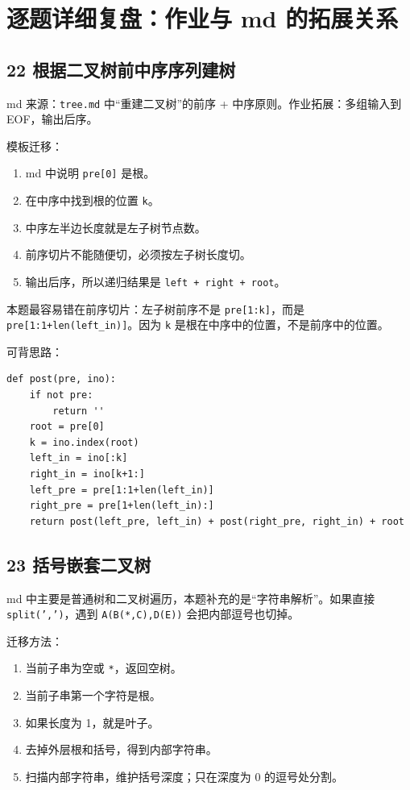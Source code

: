 \documentclass[10pt,a4paper,fontset=none]{ctexart}
\begin{document}
\section{逐题详细复盘：作业与 md 的拓展关系}

\subsection{22 根据二叉树前中序序列建树}
\begin{focusbox}
md 来源：\texttt{tree.md} 中“重建二叉树”的前序 + 中序原则。作业拓展：多组输入到 EOF，输出后序。
\end{focusbox}

模板迁移：
\begin{enumerate}
  \item md 中说明 \texttt{pre[0]} 是根。
  \item 在中序中找到根的位置 \texttt{k}。
  \item 中序左半边长度就是左子树节点数。
  \item 前序切片不能随便切，必须按左子树长度切。
  \item 输出后序，所以递归结果是 \texttt{left + right + root}。
\end{enumerate}

\begin{warnbox}
本题最容易错在前序切片：左子树前序不是 \texttt{pre[1:k]}，而是 \texttt{pre[1:1+len(left\_in)]}。因为 \texttt{k} 是根在中序中的位置，不是前序中的位置。
\end{warnbox}

可背思路：
\begin{lstlisting}[style=py]
def post(pre, ino):
    if not pre:
        return ''
    root = pre[0]
    k = ino.index(root)
    left_in = ino[:k]
    right_in = ino[k+1:]
    left_pre = pre[1:1+len(left_in)]
    right_pre = pre[1+len(left_in):]
    return post(left_pre, left_in) + post(right_pre, right_in) + root
\end{lstlisting}

\subsection{23 括号嵌套二叉树}
md 中主要是普通树和二叉树遍历，本题补充的是“字符串解析”。如果直接 \texttt{split(',')}，遇到 \texttt{A(B(*,C),D(E))} 会把内部逗号也切掉。

迁移方法：
\begin{enumerate}
  \item 当前子串为空或 \texttt{*}，返回空树。
  \item 当前子串第一个字符是根。
  \item 如果长度为 1，就是叶子。
  \item 去掉外层根和括号，得到内部字符串。
  \item 扫描内部字符串，维护括号深度；只在深度为 0 的逗号处分割。
\end{enumerate}
\end{document}
